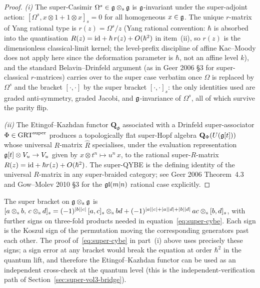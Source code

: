 \begin{proof}
\emph{(i)} The super-Casimir $\Omega^s\in\mathfrak{g}\mathbin{\otimes_{\mathrm{s}}}\mathfrak{g}$ is
$\mathfrak{g}$-invariant under the super-adjoint action:
$[\Omega^s, x\otimes 1 + 1\otimes x]_s = 0$ for all homogeneous
$x\in\mathfrak{g}$. The unique $r$-matrix of Yang rational type is
$r(z) = \Omega^s/z$ (Yang rational convention: $\hbar$ is absorbed
into the quantisation $R(z) = \mathrm{id} + \hbar\,r(z) + O(\hbar^2)$ in
item~(ii), so $r(z)$ is the dimensionless classical-limit kernel; the
level-prefix discipline of affine Kac--Moody does not apply here since
the deformation parameter is $\hbar$, not an affine level $k$), and
the standard Belavin--Drinfeld argument
(as in Geer 2006 \S3 for super-classical $r$-matrices) carries over
to the super case verbatim once $\Omega$ is replaced by $\Omega^s$ and
the bracket $[\cdot,\cdot]$ by the super bracket $[\cdot,\cdot]_s$: the
only identities used are graded anti-symmetry, graded Jacobi, and
$\mathfrak{g}$-invariance of $\Omega^s$, all of which survive the parity flip.

\emph{(ii)} The Etingof--Kazhdan functor $\mathbf{Q}_{\Phi}$ associated
with a Drinfeld super-associator $\Phi\in\mathrm{GRT}^{\mathrm{super}}$ produces a topologically
flat super-Hopf algebra $\mathbf{Q}_\Phi(U(\mathfrak{g}[t]))$ whose universal
$R$-matrix $\hat R$ specialises, under the evaluation representation
$\mathfrak{g}[t]\otimes V_u\to V_u$ given by $x\otimes t^n\mapsto u^n\,x$, to the
rational super-$R$-matrix $R(z) = \mathrm{id} + \hbar r(z) + O(\hbar^2)$. The
super-QYBE is the defining identity of the universal $R$-matrix in any
super-braided category; see Geer 2006 Theorem~4.3 and Gow--Molev 2010
\S3 for the $\mathfrak{gl}(m|n)$ rational case explicitly.
\end{proof}

\begin{remark}
\label{rem:parity-signs-brackets}
The super bracket on $\mathfrak{g}\mathbin{\otimes_{\mathrm{s}}}\mathfrak{g}$ is
$[a\mathbin{\otimes_{\mathrm{s}}} b,\, c\mathbin{\otimes_{\mathrm{s}}} d]_s
 = (-1)^{|b||c|}\,[a,c]_s\mathbin{\otimes_{\mathrm{s}}} bd
 + (-1)^{|a||c|+|a||d|+|b||d|}\,
 ac\mathbin{\otimes_{\mathrm{s}}} [b,d]_s$,
with further signs on three-fold products needed in
equation~\eqref{eq:super-cybe}. Each sign is the Koszul sign of the
permutation moving the corresponding generators past each other. The
proof of~\eqref{eq:super-cybe} in part~(i) above uses precisely these
signs; a sign error at any bracket would break the equation at order
$\hbar^2$ in the quantum lift, and therefore the Etingof--Kazhdan
functor can be used as an independent cross-check at the quantum
level (this is the independent-verification path of
Section~\ref{sec:super-vol3-bridge}).
\end{remark}

